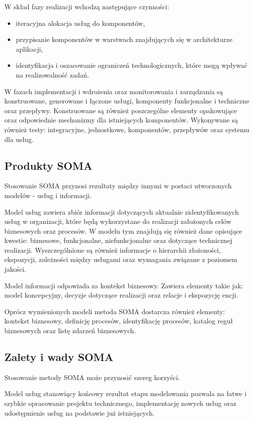 W skład fazy realizacji wchodzą następujące czynności:
\begin{itemize}
\item{iteracyjna alokacja usług do komponentów,}
\item{przypisanie komponentów w warstwach znajdujących się w architekturze aplikacji,}
\item{identyfikacja i oszacowanie ograniczeń technologicznych, które mogą wpływać na realizowalność zadań.}
\end{itemize}

W fazach implementacji i wdrożenia oraz monitorowania i zarządzania są konstruowane, generowane i łączone usługi, komponenty funkcjonalne i techniczne oraz przepływy. Konstruowane są również poszczególne elementy opakowujące oraz odpowiednie mechanizmy dla istniejących komponentów. Wykonywane są również testy: integracyjne, jednostkowe, komponentów, przepływów oraz systemu dla usług. \cite{PlatIntGor, SOMAArsIBMJour}

\subsection{Produkty SOMA}
Stosowanie SOMA przynosi rezultaty między innymi w postaci utworzonych modelów - usług i informacji. 

Model usług zawiera zbiór informacji dotyczących aktualnie zidentyfikowanych usług w organizacji, które będą wykorzystane do realizacji założonych celów biznesowych oraz procesów. W modelu tym znajdują się również dane opisujące kwestie: biznesowe, funkcjonalne, niefunkcjonalne oraz dotyczące technicznej realizacji. Wyszczególnione są również informacje o hierarchii złożoności, ekspozycji, zależności między usługami oraz wymagania związane z poziomem jakości. 

Model informacji odpowiada za kontekst biznesowy. Zawiera elementy takie jak: model koncepcyjny, decyzje dotyczące realizacji oraz relacje i ekspozycję encji.

Oprócz wymienionych modeli metoda SOMA dostarcza również elementy: kontekst biznesowy, definicję procesów, identyfikację procesów, katalog reguł biznesowych oraz listę zdarzeń biznesowych.

\subsection{Zalety i wady SOMA}
Stosowanie metody SOMA może przynosić szereg korzyści. 

Model usług stanowiący końcowy rezultat etapu modelowania pozwala na łatwe i szybkie opracowanie projektu technicznego, implementację nowych usług oraz udostępnienie usług na podstawie już istniejących. 

